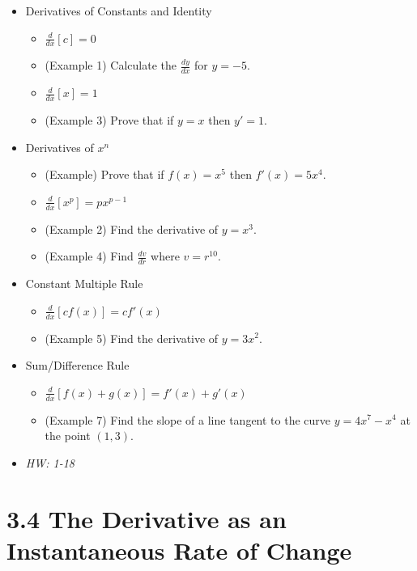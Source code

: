 \documentclass[11pt]{article}
\begin{document}
\begin{itemize}
\item Derivatives of Constants and Identity
  \begin{itemize}
    \item \(\frac{d}{dx}[c]=0\)
    \item (Example 1) Calculate the \(\frac{dy}{dx}\) for \(y=-5\).
    \item \(\frac{d}{dx}[x]=1\)
    \item (Example 3) Prove that if \(y=x\) then \(y'=1\).
  \end{itemize}
\item Derivatives of \(x^n\)
  \begin{itemize}
    \item (Example) Prove that if \(f(x)=x^5\) then \(f'(x)=5x^4\).
    \item \(\frac{d}{dx}[x^p]=px^{p-1}\)
    \item (Example 2) Find the derivative of \(y=x^3\).
    \item (Example 4) Find \(\frac{dv}{dr}\) where \(v=r^{10}\).
  \end{itemize}
\item Constant Multiple Rule
  \begin{itemize}
    \item \(\frac{d}{dx}[cf(x)]=cf'(x)\)
    \item (Example 5) Find the derivative of \(y=3x^2\).
  \end{itemize}
\item Sum/Difference Rule
  \begin{itemize}
    \item \(\frac{d}{dx}[f(x)+g(x)]=f'(x)+g'(x)\)
    \item (Example 7) Find the slope of a line tangent to the curve
          \(y=4x^7-x^4\) at the point \((1,3)\).
  \end{itemize}

\item\textit{
  HW: 1-18
}
\end{itemize}

\section*{3.4 The Derivative as an Instantaneous Rate of Change}
\end{document}
